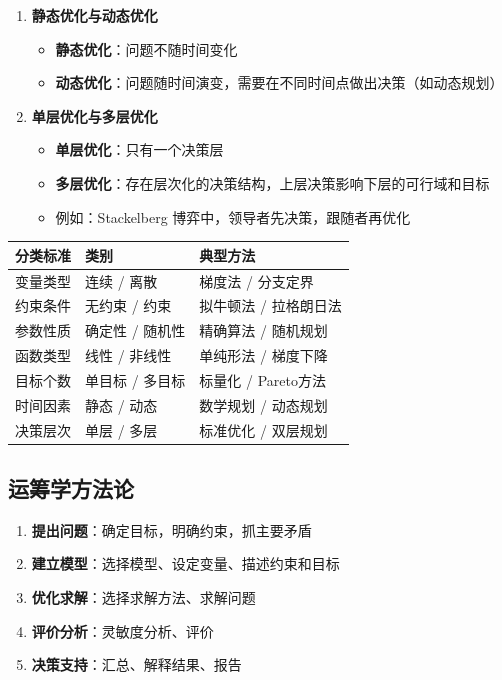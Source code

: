 \begin{conceptbox}[优化问题的分类维度]
\begin{enumerate}[label=(\arabic*), itemsep=0.4em]
    \item \textbf{静态优化与动态优化}
    \begin{itemize}
        \item \textbf{静态优化}：问题不随时间变化
        \item \textbf{动态优化}：问题随时间演变，需要在不同时间点做出决策（如动态规划）
    \end{itemize}

    \item \textbf{单层优化与多层优化}
    \begin{itemize}
        \item \textbf{单层优化}：只有一个决策层
        \item \textbf{多层优化}：存在层次化的决策结构，上层决策影响下层的可行域和目标
        \item 例如：Stackelberg 博弈中，领导者先决策，跟随者再优化
    \end{itemize}
\end{enumerate}
\end{conceptbox}

\begin{notebox}[分类总结]
\begin{center}
\begin{tabular}{lll}
\toprule
\textbf{分类标准} & \textbf{类别} & \textbf{典型方法} \\
\midrule
变量类型 & 连续 / 离散 & 梯度法 / 分支定界 \\
约束条件 & 无约束 / 约束 & 拟牛顿法 / 拉格朗日法 \\
参数性质 & 确定性 / 随机性 & 精确算法 / 随机规划 \\
函数类型 & 线性 / 非线性 & 单纯形法 / 梯度下降 \\
目标个数 & 单目标 / 多目标 & 标量化 / Pareto方法 \\
时间因素 & 静态 / 动态 & 数学规划 / 动态规划 \\
决策层次 & 单层 / 多层 & 标准优化 / 双层规划 \\
\bottomrule
\end{tabular}
\end{center}
\end{notebox}

\subsection{运筹学方法论}

\begin{conceptbox}[运筹学研究步骤]
\begin{enumerate}[label=\arabic*., leftmargin=2em]
    \item \textbf{提出问题}：确定目标，明确约束，抓主要矛盾
    \item \textbf{建立模型}：选择模型、设定变量、描述约束和目标
    \item \textbf{优化求解}：选择求解方法、求解问题
    \item \textbf{评价分析}：灵敏度分析、评价
    \item \textbf{决策支持}：汇总、解释结果、报告
\end{enumerate}
\end{conceptbox}

